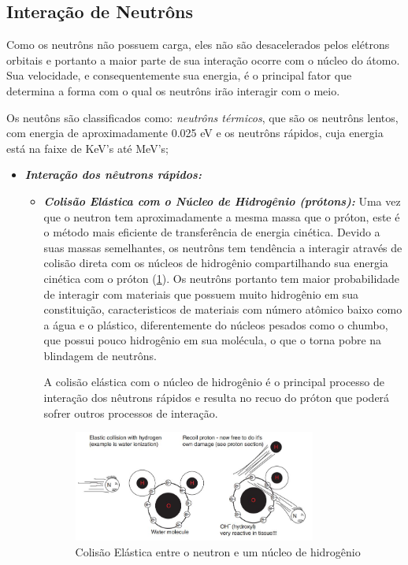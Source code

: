 \documentclass[11pt,a4paper]{article}
\begin{document}
\subsection*{Interação de Neutrôns}

    Como os neutrôns não possuem carga, eles não são desacelerados pelos elétrons orbitais e portanto a maior parte de sua interação ocorre com o núcleo do átomo. Sua velocidade, e consequentemente sua energia, é o principal fator que determina a forma com o qual os neutrôns irão interagir com o meio.

    Os neutôns são classificados como: \textit{\textcolor{CarnationPink}{neutrôns térmicos}}, que são os neutrôns lentos, com energia de aproximadamente 0.025 eV e os neutrôns rápidos, cuja energia está na faixe de KeV's até MeV's;

    \begin{itemize}
		\item \textbf{\textit{\textcolor{CarnationPink}{Interação dos nêutrons rápidos}:}} 
		
			\begin{itemize}
				\item \textbf{\textit{\textcolor{CarnationPink}{Colisão Elástica com o Núcleo de Hidrogênio (prótons)}:}} Uma vez que o neutron tem aproximadamente a mesma massa que o próton, este é o método mais eficiente de transferência de energia cinética. Devido a suas massas semelhantes, os neutrôns tem tendência a interagir através de colisão direta com os núcleos de hidrogênio compartilhando sua energia cinética com o próton (\ref{fig:colisaoElasticaNeutronProton}). Os neutrôns portanto tem maior probabilidade de interagir com materiais que possuem muito hidrogênio em sua constituição, caracteristicos de materiais com número atômico baixo como a água e o plástico, diferentemente do núcleos pesados como o chumbo, que possui pouco hidrogênio em sua molécula, o que o torna pobre na blindagem de neutrôns. 
				
				A colisão elástica com o núcleo de hidrogênio é o principal processo de interação dos nêutrons rápidos e resulta no recuo do próton que poderá sofrer outros processos de interação. 

					\begin{figure}[h]
						\centering
						\includegraphics[width=0.8\textwidth]{Imagens/colisaoElasticaNeutronProton.JPG}
						\caption{Colisão Elástica entre o neutron e um núcleo de hidrogênio}
						\label{fig:colisaoElasticaNeutronProton}                
					\end{figure}


\end{itemize}
\end{itemize}
\end{document}
